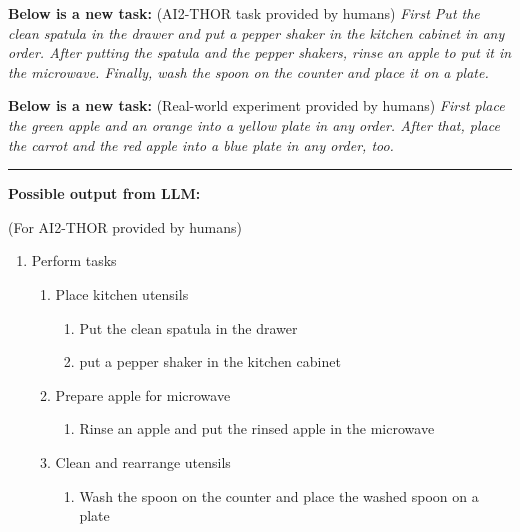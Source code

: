 \documentclass{article}
\begin{document}
\vspace{1em}
\textbf{Below is a new task:} {\color{blue}(AI2-THOR task provided by humans)}
\textit{First Put the clean spatula in the drawer and put a pepper shaker in the kitchen cabinet in any order. After putting the spatula and the pepper shakers, rinse an apple to put it in the microwave. Finally, wash the spoon on the counter and place it on a plate.}

\textbf{Below is a new task:} {\color{blue}(Real-world experiment provided by humans)}
\textit{First place the green apple and an orange into a yellow plate in any order. After that, place the carrot and the red apple into a blue plate in any order, too.}

\noindent\rule{16cm}{0.4pt}
 
\textbf{Possible output from LLM:}

{\color{blue}(For AI2-THOR provided by humans)}
\begin{enumerate}
\item Perform tasks
\begin{enumerate}
    \item Place kitchen utensils
    \begin{enumerate}
        \item Put the clean spatula in the drawer
        \item put a pepper shaker in the kitchen cabinet
    \end{enumerate}
    \item Prepare apple for microwave
    \begin{enumerate}
        \item Rinse an apple and put the rinsed apple in the microwave
    \end{enumerate}
    \item Clean and rearrange utensils
    \begin{enumerate}
        \item Wash the spoon on the counter and place the washed spoon on a plate
    \end{enumerate}
\end{enumerate}
\end{enumerate}
\end{document}
